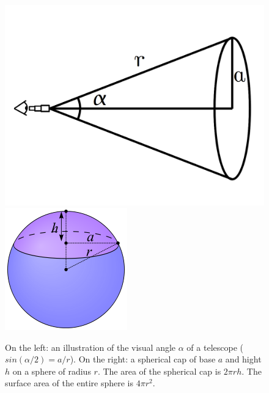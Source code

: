 \documentclass{article}
\begin{document}
\begin{figure}[htbp]
\begin{center}
\includegraphics[scale=0.20]{14_images/Visual_angle.png}\hspace{3cm}
\includegraphics[scale=0.50]{14_images/Spherical_Cap.png}
\caption{On the left: an illustration of the visual angle $\alpha$ of a telescope ($sin(\alpha/2) = a/r$).
On the right: a spherical cap of base $a$ and hight $h$ on a sphere of radius $r$. The area of the spherical cap is $2\pi r h$.
The surface area of the entire sphere is $4\pi r^2$.}
\label{default}
\end{center}
\end{figure}
\end{document}
